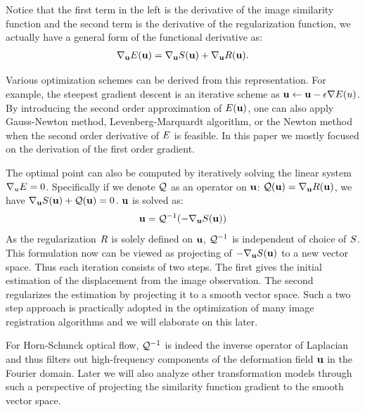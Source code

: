 \documentclass[letterpaper,12pt]{article}
\begin{document}
Notice that the first term in the left is the derivative of the image similarity function and the second term is the derivative of the regularization function, we actually have a general form of the functional derivative as:
\begin{align}
\nabla_{\mathbf{u}} E(\mathbf{u}) = \nabla_{\mathbf{u}} S(\mathbf{u}) + \nabla_{\mathbf{u}} R(\mathbf{u}).
\end{align}


Various optimization schemes can be derived from this representation. For example, the steepest gradient descent is an iterative scheme as $\mathbf{u} \leftarrow \mathbf{u} - \epsilon \nabla E(u)$. By introducing the second order approximation of $E(\mathbf{u})$, one can also apply Gauss-Newton method, Levenberg-Marquardt algorithm, or the Newton method when the second order derivative of $E$ is feasible. In this paper we mostly focused on the derivation of the first order gradient.

The optimal point can also be computed by iteratively solving the linear system $\nabla_u E = 0$. 
Specifically if we denote $\mathcal{Q}$ as an operator on $\mathbf{u}$: $\mathcal{Q}(\mathbf{u}) = \nabla_{\mathbf{u}} R(\mathbf{u})$, we have $\nabla_{\mathbf{u}} S(\mathbf{u}) + \mathcal{Q}(\mathbf{u}) = 0$. $\mathbf{u}$ is solved as: 
\begin{align}
\mathbf{u} = \mathcal{Q}^{-1}(-\nabla_{\mathbf{u}} S(\mathbf{u}))
\label{eq:projection}
\end{align}
As the regularization $R$ is solely defined on $\mathbf{u}$, $\mathcal{Q}^{-1}$ is
independent of choice of $S$. This formulation now can be viewed as
projecting of $-\nabla_{\mathbf{u}} S(\mathbf{u})$ to a new vector space. Thus each iteration
consists of two steps. The first gives the initial estimation of the displacement from the image observation. The second regularizes the estimation by projecting it to a smooth vector space. Such a two step approach is practically adopted in the optimization of many image registration algorithms and we will elaborate on this later.

For Horn-Schunck optical flow, $\mathcal{Q}^{-1}$ is indeed the inverse
operator of Laplacian and thus filters out high-frequency components
of the deformation field $\mathbf{u}$ in the Fourier domain. Later we will
also analyze other transformation models through such a perspective of
projecting the similarity function gradient to the smooth vector space.	
\end{document}

